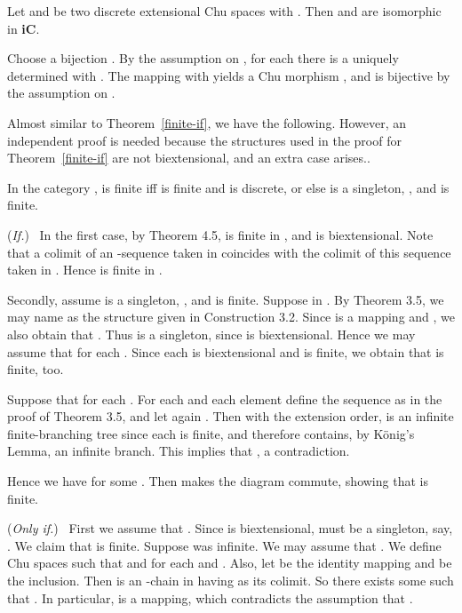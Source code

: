\documentclass{LMCS}
\let\pf\proof
\let\epf\endproof
\begin{document}
\begin{rem}\label{rem:complext-iso}
  Let  and  be two
  discrete extensional Chu spaces with . Then  and
   are isomorphic in {\bf iC}. 
\end{rem}

\pf
Choose a bijection . By the assumption on
, for each  there is a uniquely determined  with . The mapping  with  yields a Chu morphism
, and  is bijective by the
assumption on . 
\epf

Almost similar to Theorem~\ref{finite-if}, we have the following. 
However, an independent proof is needed because
the structures used in the proof for Theorem~\ref{finite-if}
are not biextensional, and an extra case arises.. 


\begin{thm}\label{finite-if-finite}
   In the category ,  is finite iff 
   is finite and  is discrete, or else  is a singleton, , and  is finite.
\end{thm}




\pf (\emph{If.}) ~In the first case, by Theorem 4.5,  is
finite in , and  is biextensional. Note that
a colimit of an -sequence taken in 
coincides with the colimit of this sequence taken in
. Hence  is finite in .

Secondly, assume  is a singleton, , and  is
finite.  Suppose  in .  By Theorem
3.5, we may name  as the
structure  given in Construction 3.2. Since
 is a mapping and , we also obtain
that . Thus  is a singleton, since  is
biextensional. Hence we may assume that  for each .  Since each  is biextensional and  is finite, we
obtain that  is finite, too.

Suppose that  for each .  For each  and each element  define the sequence  as
in the proof of Theorem 3.5, and let again . Then with the extension order,  is an infinite
finite-branching tree since each  is finite, and therefore 
contains, by K\"onig's Lemma, an infinite branch. This implies that , a contradiction.

Hence we have  for some .  Then  makes the diagram
commute, showing that  is finite.

(\emph{Only if.}) ~First we assume that .  Since  is biextensional,  must be a singleton, say, . We
claim that  is finite.  Suppose  was infinite. We may
assume that .
We define Chu spaces    such that
  and    for each    and
. Also, let    be the identity mapping and 
  be the inclusion.
Then    is an -chain in   having    as its
colimit. So there exists some    such  that . In particular,
  is a mapping, which contradicts the assumption 
that .
\end{document}
